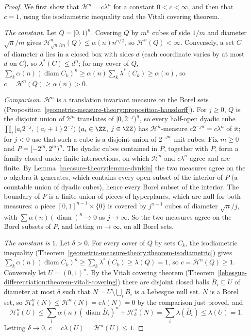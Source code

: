 \begin{proof}
We first show that $\mathcal{H}^n = c\lambda^n$ for a constant $0 < c < \infty$, and then that $c = 1$, using the isodiametric inequality and the Vitali
covering theorem.

\emph{The constant.} Let $Q = [0, 1)^n$. Covering $Q$ by $m^n$ cubes of side $1/m$ and diameter $\sqrt n/m$ gives $\mathcal{H}^n_{\sqrt n/m}(Q) \leq \alpha(n)n^{n/2}$, so
$\mathcal{H}^n(Q) < \infty$. Conversely, a set $C$ of diameter $d$ lies in a closed box with sides $d$ (each coordinate varies by at most $d$ on $C$), so $\lambda^*(C) \leq d^n$; for any cover
of $Q$, $\sum_k\alpha(n)(\operatorname{diam}C_k)^n \geq \alpha(n)\sum_k\lambda^*(C_k) \geq \alpha(n)$, so $c = \mathcal{H}^n(Q) \geq \alpha(n) > 0$.

\emph{Comparison.} $\mathcal{H}^n$ is a translation invariant measure on the Borel sets (Proposition~\ref{geometric-measure-theory:proposition-hausdorff}). For $j \geq 0$, $Q$ is the disjoint union of $2^{jn}$
translates of $[0, 2^{-j})^n$, so every half-open dyadic cube $\prod_i[a_i2^{-j}, (a_i + 1)2^{-j})$ ($a_i \in \ZZ$, $j \in \ZZ$) has $\mathcal{H}^n$-measure $c2^{-jn} = c\lambda^n$ of it; for
$j < 0$ use that such a cube is a disjoint union of $2^{-jn}$ unit cubes. Fix $m \geq 0$ and $P = [-2^m, 2^m)^n$. The dyadic cubes contained in $P$, together with $P$, form a family closed under
finite intersections, on which $\mathcal{H}^n$ and $c\lambda^n$ agree and are finite. By Lemma~\ref{measure-theory:lemma-dynkin} the two measures agree on the $\sigma$-algebra it generates, which
contains every open subset of the interior of $P$ (a countable union of dyadic cubes), hence every Borel subset of the interior. The boundary of $P$ is a finite union of pieces of hyperplanes,
which are null for both measures: a piece $[0, 1]^{n-1} \times \{0\}$ is covered by $j^{n-1}$ cubes of diameter $\sqrt n/j$, with $\sum\alpha(n)(\operatorname{diam})^n \to 0$ as $j \to \infty$. So
the two measures agree on the Borel subsets of $P$, and letting $m \to \infty$, on all Borel sets.

\emph{The constant is $1$.} Let $\delta > 0$. For every cover of $Q$ by sets $C_k$, the isodiametric inequality (Theorem~\ref{geometric-measure-theory:theorem-isodiametric}) gives
$\sum_k\alpha(n)(\operatorname{diam}C_k)^n \geq \sum_k\lambda^*(C_k) \geq \lambda(Q) = 1$, so $c = \mathcal{H}^n(Q) \geq 1$. Conversely let $U = (0, 1)^n$. By the Vitali covering theorem
(Theorem~\ref{lebesgue-differentiation:theorem-vitali-covering}) there are disjoint closed balls $\overline{B}_i \subseteq U$ of diameter at most $\delta$ such that $N = U \setminus \bigcup_i\overline{B}_i$ is a
Lebesgue null set. $N$ is a Borel set, so $\mathcal{H}^n_\delta(N) \leq \mathcal{H}^n(N) = c\lambda(N) = 0$ by the comparison just proved, and
\[
\mathcal{H}^n_\delta(U) \leq \sum_i\alpha(n)(\operatorname{diam}\overline{B}_i)^n + \mathcal{H}^n_\delta(N) = \sum_i\lambda(\overline{B}_i) \leq \lambda(U) = 1.
\]
Letting $\delta \to 0$, $c = c\lambda(U) = \mathcal{H}^n(U) \leq 1$.


\end{proof}

